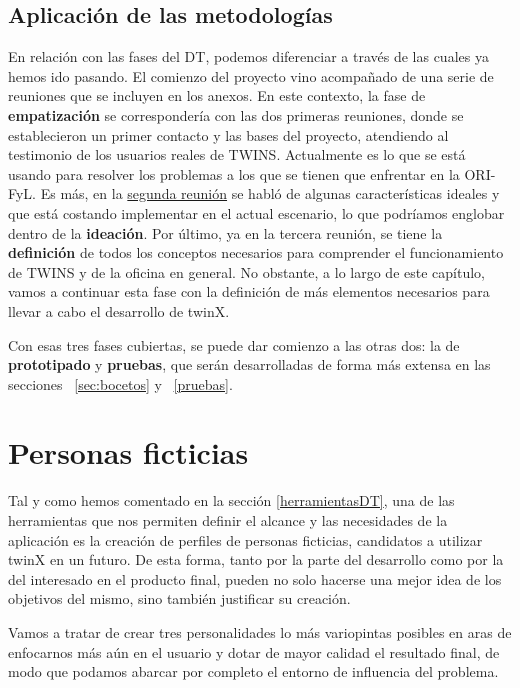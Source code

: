 \subsection{Aplicación de las metodologías}

En relación con las fases del DT, podemos diferenciar a través de las cuales ya hemos ido pasando. El comienzo del proyecto vino acompañado de una serie de reuniones que se incluyen en los anexos. En este contexto, la fase de \textbf{empatización} se correspondería con las dos primeras reuniones, donde se establecieron un primer contacto y las bases del proyecto, atendiendo al testimonio de los usuarios reales de TWINS. Actualmente es lo que se está usando para resolver los problemas a los que se tienen que enfrentar en la ORI-FyL. Es más, en la \hyperref[reunion2]{segunda reunión} se habló de algunas características ideales y que está costando implementar en el actual escenario, lo que podríamos englobar dentro de la \textbf{ideación}. Por último, ya en la tercera reunión, se tiene la \textbf{definición} de todos los conceptos necesarios para comprender el funcionamiento de TWINS y de la oficina en general. No obstante, a lo largo de este capítulo, vamos a continuar esta fase con la definición de más elementos necesarios para llevar a cabo el desarrollo de twinX.

Con esas tres fases cubiertas, se puede dar comienzo a las otras dos: la de \textbf{prototipado} y \textbf{pruebas}, que serán desarrolladas de forma más extensa en las secciones ~\ref{sec:bocetos} y ~\ref{pruebas}. %

\section{Personas ficticias}
\label{sec:personas}

Tal y como hemos comentado en la sección \ref{herramientasDT}, una de las herramientas que nos permiten definir el alcance y las necesidades de la aplicación es la creación de perfiles de personas ficticias, candidatos a utilizar twinX en un futuro. De esta forma, tanto por la parte del desarrollo como por la del interesado en el producto final, pueden no solo hacerse una mejor idea de los objetivos del mismo, sino también justificar su creación.

Vamos a tratar de crear tres personalidades lo más variopintas posibles en aras de enfocarnos más aún en el usuario y dotar de mayor calidad el resultado final, de modo que podamos abarcar por completo el entorno de influencia del problema.

